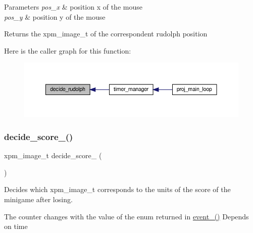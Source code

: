 \begin{DoxyParams}{Parameters}
{\em pos\+\_\+x} & position x of the mouse \\
\hline
{\em pos\+\_\+y} & position y of the mouse\\
\hline
\end{DoxyParams}
\begin{DoxyReturn}{Returns}
the xpm\+\_\+image\+\_\+t of the correspondent rudolph position 
\end{DoxyReturn}
Here is the caller graph for this function\+:
\nopagebreak
\begin{figure}[H]
\begin{center}
\leavevmode
\includegraphics[width=350pt]{group__loading__xpms_gada234fac1a8886b19a988eb80e99ef15_icgraph}
\end{center}
\end{figure}
\mbox{\label{group__loading__xpms_ga49c14da168cc130190ad4808e0c889bf}} 
\subsubsection{\texorpdfstring{decide\+\_\+score\+\_()}{decide\_score\_1()}}
{\footnotesize\ttfamily xpm\+\_\+image\+\_\+t decide\+\_\+score\+\_ (\begin{DoxyParamCaption}{ }\end{DoxyParamCaption})}



Decides which xpm\+\_\+image\+\_\+t corresponds to the units of the score of the minigame after losing. 

The counter changes with the value of the enum returned in \hyperlink{group__loading__xpms_ga70f5397af0d313815b96cf662cd48f65}{event\+\_()} Depends on time

